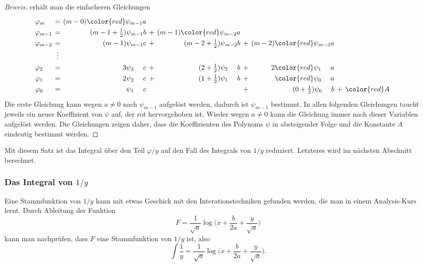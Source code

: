 \begin{proof}[Beweis]
erhält man die einfacheren Gleichungen
\begin{equation}
\renewcommand{\arraycolsep}{2pt}
\renewcommand{\arraystretch}{1.3}
\begin{array}{lcrcrcrcrcrcrcr}
\varphi_m
&=&
(m-0){\color{red}\psi_{m-1}}a & &     & & 
& &
\\
\varphi_{m-1}
&=&
(m-1+\frac12)\psi_{m-1}b
&+&
(m-1){\color{red}\psi_{m-2}}a
& &
& &
\\
\varphi_{m-2}
&=&
(m-1)\psi_{m-1}c
&+&
(m-2+\frac12)\psi_{m-2}b
&+&
(m-2){\color{red}\psi_{m-3}}a
& &
\\
&\vdots&&&&&&&&&&&
\\
\varphi_2
&=&
3\psi_{3\phantom{-m}}c
&+&
(2+\frac12)\psi_{2\phantom{-m}}b
&+&
2{\color{red}\psi_{1\phantom{-m}}}a
& &
\\
\varphi_1
&=&
2\psi_{2\phantom{-m}}c
&+&
(1+\frac12)\psi_{1\phantom{-m}}b
&+&
{\color{red}\psi_{0\phantom{-m}}}a
& &
\\
\varphi_0
&=&
\psi_{1\phantom{-m}}c
& &
&+&
(0+\frac12) \psi_{0\phantom{-m}}b
&+&{\color{red}A}
\end{array}
\end{equation}
Die erste Gleichung kann wegen $a\ne 0$ nach $\psi_{m-1}$ aufgelöst werden,
dadurch ist $\psi_{m-1}$ bestimmt.
In allen folgenden Gleichungen taucht jeweils ein neuer Koeffizient
von $\psi$ auf, der rot hervorgehoben ist.
Wieder wegen $a\ne 0$ kann die Gleichung immer nach dieser Variablen
aufgelöst werden.
Die Gleichungen zeigen daher, dass die Koeffizienten des Polynoms $\psi$
in absteigender Folge und die Konstante $A$ eindeutig bestimmt werden.
\end{proof}

Mit diesem Satz ist das Integral über den Teil $\varphi/y$ auf den
Fall des Integrals von $1/y$ reduziert.
Letzteres wird im nächsten Abschnitt berechnet.

%
%
\subsubsection{Das Integral von $1/y$}
Eine Stammfunktion von $1/y$ kann mit etwas Geschick mit den 
Interationstechniken gefunden werden, die man in einem Analysis-Kurs
lernt.
Durch Ableitung der Funktion
\[
F
=
\frac{1}{\sqrt{a}}\log\biggl(x+\frac{b}{2a}+\frac{y}{\sqrt{a}}\biggr)
\]
kann man nachprüfen, dass $F$ eine Stammfunktion von $1/y$ ist,
also
\begin{equation}
\int
\frac{1}{y}
=
\frac{1}{\sqrt{a}}\log\biggl(x+\frac{b}{2a}+\frac{y}{\sqrt{a}}\biggr).
\end{equation}

